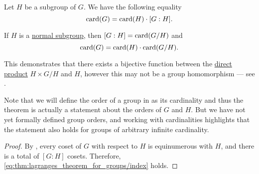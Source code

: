 \begin{theorem}\label{thm:lagranges_theorem_for_groups}
  Let \( H \) be a subgroup of \( G \). We have the following equality
  \begin{equation}\label{eq:thm:lagranges_theorem_for_groups/index}
    \operatorname{card}(G) = \operatorname{card}(H) \cdot [G : H].
  \end{equation}

  If \( H \) is a \hyperref[thm:normal_subgroup_equivalences]{normal subgroup}, then \( [G : H] = \operatorname{card}(G / H) \) and
  \begin{equation}\label{eq:thm:lagranges_theorem_for_groups/card}
    \operatorname{card}(G) = \operatorname{card}(H) \cdot \operatorname{card}(G / H).
  \end{equation}

  This demonstrates that there exists a bijective function between the \hyperref[def:monoid_direct_product]{direct product} \( H \times G / H \) and \( H \), however this may not be a group homomorphism --- see .

  Note that we will define the order of a group in  as its cardinality and thus the theorem is actually a statement about the orders of \( G \) and \( H \). But we have not yet formally defined group orders, and working with cardinalities highlights that the statement also holds for groups of arbitrary infinite cardinality.
\end{theorem}
\begin{proof}
  By , every coset of \( G \) with respect to \( H \) is equinumerous with \( H \), and there is a total of \( [G : H] \) cosets. Therefore, \eqref{eq:thm:lagranges_theorem_for_groups/index} holds.
\end{proof}


